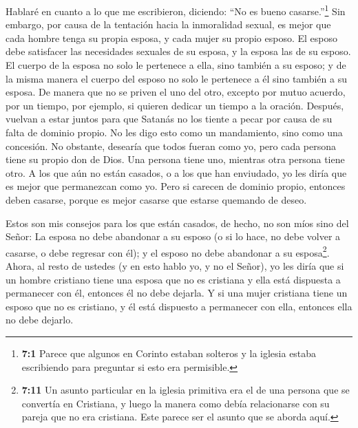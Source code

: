  Hablaré en cuanto a lo que me escribieron, diciendo: ``No
es bueno casarse.''\footnote{\textbf{7:1} Parece que algunos en Corinto
  estaban solteros y la iglesia estaba escribiendo para preguntar si
  esto era permisible.}  Sin embargo, por causa de la
tentación hacia la inmoralidad sexual, es mejor que cada hombre tenga su
propia esposa, y cada mujer su propio esposo.  El esposo
debe satisfacer las necesidades sexuales de su esposa, y la esposa las
de su esposo.  El cuerpo de la esposa no solo le pertenece a
ella, sino también a su esposo; y de la misma manera el cuerpo del
esposo no solo le pertenece a él sino también a su esposa. 
De manera que no se priven el uno del otro, excepto por mutuo acuerdo,
por un tiempo, por ejemplo, si quieren dedicar un tiempo a la oración.
Después, vuelvan a estar juntos para que Satanás no los tiente a pecar
por causa de su falta de dominio propio.  No les digo esto
como un mandamiento, sino como una concesión.  No obstante,
desearía que todos fueran como yo, pero cada persona tiene su propio don
de Dios. Una persona tiene uno, mientras otra persona tiene otro.
 A los que aún no están casados, o a los que han enviudado,
yo les diría que es mejor que permanezcan como yo.  Pero si
carecen de dominio propio, entonces deben casarse, porque es mejor
casarse que estarse quemando de deseo.

 Estos son mis consejos para los que están casados, de
hecho, no son míos sino del Señor: La esposa no debe abandonar a su
esposo  (o si lo hace, no debe volver a casarse, o debe
regresar con él); y el esposo no debe abandonar a su esposa\footnote{\textbf{7:11}
  Un asunto particular en la iglesia primitiva era el de una persona que
  se convertía en Cristiana, y luego la manera como debía relacionarse
  con su pareja que no era cristiana. Este parece ser el asunto que se
  aborda aquí.}.  Ahora, al resto de ustedes (y en esto
hablo yo, y no el Señor), yo les diría que si un hombre cristiano tiene
una esposa que no es cristiana y ella está dispuesta a permanecer con
él, entonces él no debe dejarla.  Y si una mujer cristiana
tiene un esposo que no es cristiano, y él está dispuesto a permanecer
con ella, entonces ella no debe dejarlo.


